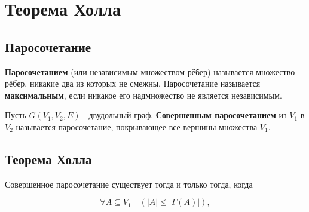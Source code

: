 {\section*{Теорема Холла}

\subsection*{Паросочетание}
\textbf{Паросочетанием} (или независимым множеством рёбер) называется множество рёбер, никакие два из которых не смежны.  
Паросочетание называется \textbf{максимальным}, если никакое его надмножество не является независимым.

Пусть $G(V_1, V_2, E)$ - двудольный граф.  
\textbf{Совершенным паросочетанием} из $V_1$ в $V_2$ называется паросочетание, покрывающее все вершины множества $V_1$.

\subsection*{Теорема Холла}
Совершенное паросочетание существует тогда и только тогда, когда


\[
\forall A \subseteq V_1 \quad (|A| \leq |\Gamma(A)|),
\]



    \newpage
}
